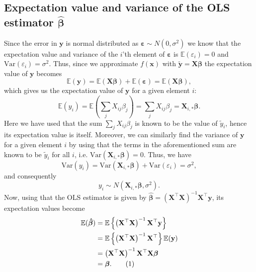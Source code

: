 \documentclass[aps,pra,english,notitlepage,reprint,nofootinbib]{revtex4-1}  %
\newcommand\numberthis{\addtocounter{equation}{1}\tag{\theequation}}
\begin{document}
\subsection{Expectation value and variance of the OLS estimator \texorpdfstring{$\boldsymbol{\hat{\beta}}$}{Lg}}\label{subapp:beta OLS}
Since the error in $\mathbf{y}$ is normal distributed as $\boldsymbol{\varepsilon}\sim N(0,\sigma^2)$ we know that the expectation value and variance of the $i$'th element of $\boldsymbol{\varepsilon}$ is $\mathbb{E}(\varepsilon_i)=0$ and $\textrm{Var}(\varepsilon_i)=\sigma^2$. Thus, since we approximate $f(\mathbf{x})$ with $\mathbf{\tilde{y}}=\mathbf{X}\boldsymbol{\beta}$ the expectation value of $\mathbf{y}$ becomes 
\begin{equation}
\mathbb{E}(\mathbf{y})=\mathbb{E}(\mathbf{X}\boldsymbol{\beta}) + \mathbb{E}(\boldsymbol{\varepsilon}) = \mathbb{E}(\mathbf{X}\boldsymbol{\beta}),
\end{equation}
which gives us the expectation value of $\mathbf{y}$ for a given element $i$:
\begin{equation}
\mathbb{E}(y_i) = \mathbb{E}\left(\sum_jX_{ij}\beta_j\right) = \sum_jX_{ij}\beta_j = \mathbf{X}_{i,*}\boldsymbol{\beta}.
\end{equation}
Here we have used that the sum $\sum_jX_{ij}\beta_j$ is known to be the value of $\tilde{y}_i$, hence its expectation value is itself. Moreover, we can similarly find the variance of $\mathbf{y}$ for a given element $i$ by using that the terms in the aforementioned sum are known to be $\tilde{y}_i$ for all $i$, i.e. $\textrm{Var}(\mathbf{X}_{i,*}\boldsymbol{\beta})=0$. Thus, we have
\begin{equation}
\textrm{Var}(y_i) = \textrm{Var}(\mathbf{X}_{i,*}\boldsymbol{\beta}) + \textrm{Var}(\varepsilon_i) = \sigma^2,
\end{equation}
and consequently
\begin{equation}
  y_i\sim N(\mathbf{X}_{i,*}\boldsymbol{\beta},\sigma^2).
\end{equation}
Now, using that the OLS estimator is given by $\boldsymbol{\hat{\beta}}=\left(\mathbf{X}^\top\mathbf{X}\right)^{-1}\mathbf{X}^\top\mathbf{y}$, its expectation values become
\begin{align*}
  \mathbb{E}(\boldsymbol{\hat{\beta}})&=\mathbb{E}\left\{ \left(\mathbf{X}^\top\mathbf{X}\right)^{-1}\mathbf{X}^\top\mathbf{y} \right\} \\
  &= \mathbb{E}\left\{\left(\mathbf{X}^\top\mathbf{X}\right)^{-1}\mathbf{X}^\top\right\} \mathbb{E}(\mathbf{y}) \\
  &= \left(\mathbf{X}^\top\mathbf{X}\right)^{-1}\mathbf{X}^\top\mathbf{X}\boldsymbol{\beta} \\
  &= \boldsymbol{\beta}. \numberthis \label{appeq:expect beta OLS}
\end{align*}
\end{document}
